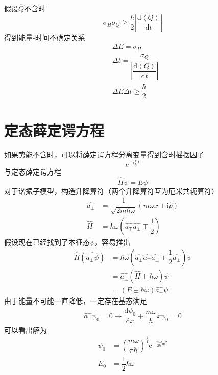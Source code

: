 \documentclass[12pt, a4paper, oneside]{ctexart}
\begin{document}
	\quad\quad 假设$\hat{Q}$不含时
	\begin{equation}
		\sigma_{H}\sigma_{Q}\ge\dfrac{\hbar}{2}\left|\dfrac{\mathrm{d}\left<Q\right>}{\mathrm{d}t}\right|
	\end{equation}
	\quad\quad 得到能量-时间不确定关系
	\begin{align}
		&\Delta E=\sigma_{H}\\
		&\Delta t=\dfrac{\sigma_{Q}}{\left|\dfrac{\mathrm{d}\left<Q\right>}{\mathrm{d}t}\right|}\\
		&\Delta E\Delta t\ge\dfrac{\hbar}{2}
	\end{align}
	\section{定态薛定谔方程}
	如果势能不含时，可以将薛定谔方程分离变量得到含时摇摆因子
	\begin{equation}
		\mathrm{e}^{-\mathrm{i}\frac{E}{\hbar}t}
	\end{equation}
	\quad\quad 与定态薛定谔方程
	\begin{equation}
		\hat{H}\psi=E\psi
	\end{equation}
	\quad\quad 对于谐振子模型，构造升降算符（两个升降算符互为厄米共轭算符）
	\begin{align}
		\hat{a_{\pm}}&=\dfrac{1}{\sqrt{2m\hbar\omega}}\left(m\omega x\mp\mathrm{i}\hat{p}\right)\\
		\hat{H}&=\hbar\omega\left(\hat{a_{\mp}}\hat{a_{\pm}}\mp\dfrac{1}{2}\right)
	\end{align}
	\quad\quad 假设现在已经找到了本征态$\psi$，容易推出
	\begin{align}
		\hat{H}\left(\hat{a_{\pm}\psi}\right)&=\hbar\omega\left(\hat{a_{\pm}}\hat{a_{\mp}}\hat{a_{\pm}}\mp\dfrac{1}{2}\hat{a_{\pm}}\right)\psi\\
		&=\hat{a_{\pm}}\left(\hat{H}\pm\hbar\omega\right)\psi\\
		&=\left(E\pm\hbar\omega\right)\hat{a_{\pm}}\psi
	\end{align}
	\quad\quad 由于能量不可能一直降低，一定存在基态满足
	\begin{align}
		\hat{a_{-}}\psi_{0}=0\to\dfrac{\mathrm{d}\psi_{0}}{\mathrm{d}x}+\dfrac{m\omega}{\hbar}x\psi_{0}=0
	\end{align}
	\quad\quad 可以看出解为
	\begin{align}
		\psi_{0}&=\left(\dfrac{m\omega}{\pi\hbar}\right)^{\frac{1}{4}}\mathrm{e}^{-\frac{m\omega}{2\hbar}x^{2}}\\
		E_{0}&=\dfrac{1}{2}\hbar\omega
	\end{align}
\end{document}
